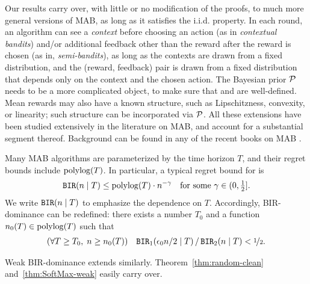  Our results carry over, with little or no modification of the proofs, to much more general versions of MAB, as long as it satisfies the i.i.d. property. In each round, an algorithm can see a \emph{context} before choosing an action (as in \emph{contextual bandits}) and/or additional feedback other than the reward after the reward is chosen (as in, \eg \emph{semi-bandits}), as long as the contexts are drawn from a fixed distribution, and the (reward, feedback) pair is drawn from a fixed distribution that depends only on the context and the chosen action. The Bayesian prior $\mathcal{P}$ needs to be a more complicated object, to make sure that \PMR and \BIR are well-defined. Mean rewards may also have a known structure, such as Lipschitzness, convexity, or linearity; such structure can be incorporated via $\mathcal{P}$. All these extensions have been studied extensively in the literature on MAB, and account for a substantial segment thereof. Background can be found in any of the recent books on MAB \citep{Bubeck-survey12,slivkins-MABbook,LS19bandit-book}.


Many MAB algorithms are parameterized by the time horizon $T$, and their regret bounds include $\polylog(T)$. In particular,  a typical regret bound for \BIR is
\begin{align}
    \BIR(n\mid T)\leq \polylog(T)\cdot n^{-\gamma}
    \quad \text{for some $\gamma\in(0,\tfrac12]$}.
\end{align}
We write $\mathtt{BIR}(n\mid T)$ to emphasize the dependence on $T$. Accordingly, BIR-dominance can be redefined: there exists a number $T_0$ and a function $n_0(T)\in \polylog(T)$
such that
\begin{align}\label{eq:random-better-messy}
(\forall T\geq T_0,\; n\geq n_0(T)) \quad
\mathtt{BIR}_1(\epsilon_0 n /2\mid T)\,/\, \mathtt{BIR}_2(n\mid T) <\nicefrac12.
\end{align}

\noindent Weak BIR-dominance extends similarly.
Theorem~\ref{thm:random-clean} and~\ref{thm:SoftMax-weak} easily carry over.








